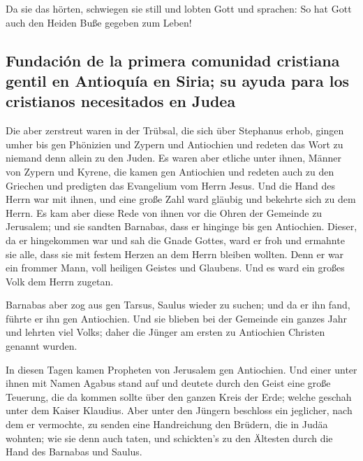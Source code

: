  Da sie das hörten, schwiegen sie still und lobten Gott
und sprachen: So hat Gott auch den Heiden Buße gegeben zum Leben!

\hypertarget{fundaciuxf3n-de-la-primera-comunidad-cristiana-gentil-en-antioquuxeda-en-siria-su-ayuda-para-los-cristianos-necesitados-en-judea}{%
\subsection{Fundación de la primera comunidad cristiana gentil en
Antioquía en Siria; su ayuda para los cristianos necesitados en
Judea}\label{fundaciuxf3n-de-la-primera-comunidad-cristiana-gentil-en-antioquuxeda-en-siria-su-ayuda-para-los-cristianos-necesitados-en-judea}}

 Die aber zerstreut waren in der Trübsal, die sich über
Stephanus erhob, gingen umher bis gen Phönizien und Zypern und
Antiochien und redeten das Wort zu niemand denn allein zu den Juden.
 Es waren aber etliche unter ihnen, Männer von Zypern und
Kyrene, die kamen gen Antiochien und redeten auch zu den Griechen und
predigten das Evangelium vom Herrn Jesus.  Und die Hand
des Herrn war mit ihnen, und eine große Zahl ward gläubig und bekehrte
sich zu dem Herrn.  Es kam aber diese Rede von ihnen vor
die Ohren der Gemeinde zu Jerusalem; und sie sandten Barnabas, dass er
hinginge bis gen Antiochien.  Dieser, da er hingekommen
war und sah die Gnade Gottes, ward er froh und ermahnte sie alle, dass
sie mit festem Herzen an dem Herrn bleiben wollten.  Denn
er war ein frommer Mann, voll heiligen Geistes und Glaubens. Und es ward
ein großes Volk dem Herrn zugetan.

 Barnabas aber zog aus gen Tarsus, Saulus wieder zu
suchen;  und da er ihn fand, führte er ihn gen
Antiochien. Und sie blieben bei der Gemeinde ein ganzes Jahr und lehrten
viel Volks; daher die Jünger am ersten zu Antiochien Christen genannt
wurden.

 In diesen Tagen kamen Propheten von Jerusalem gen
Antiochien.  Und einer unter ihnen mit Namen Agabus stand
auf und deutete durch den Geist eine große Teuerung, die da kommen
sollte über den ganzen Kreis der Erde; welche geschah unter dem Kaiser
Klaudius.  Aber unter den Jüngern beschloss ein
jeglicher, nach dem er vermochte, zu senden eine Handreichung den
Brüdern, die in Judäa wohnten;  wie sie denn auch taten,
und schickten's zu den Ältesten durch die Hand des Barnabas und Saulus.

